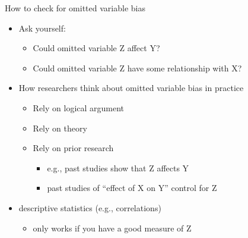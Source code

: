 \begin{frame}{How to check for omitted variable bias}
	\begin{itemize}
	\item Ask yourself: 
		\begin{itemize}
		\item Could omitted variable Z affect Y? 
		\item Could omitted variable Z have some relationship with X?
		\end{itemize}
	\item How researchers think about omitted variable bias in practice
		\begin{itemize}
		\item Rely on logical argument
		\item Rely on theory
		\item Rely on prior research
			\begin{itemize}
				\item e.g., past studies show that Z affects Y
				\item past studies of ``effect of X on Y'' control for Z
			\end{itemize}
		\end{itemize}
		\item descriptive statistics (e.g., correlations)	
		\begin{itemize}
			\item only works if you have a good measure of Z
		\end{itemize}
	\end{itemize}
\end{frame}
		
\begin{comment}
\begin{frame}{How to check for omitted variable bias}
	\begin{itemize}
	\item In practice, diagnostic tests not used as much as logical arguments/literature review
		\begin{itemize}
		\vspace{2mm}
		\item Correlation only picks up linear relationships; omitted variable bias includes non-linear relationships
		\vspace{2mm}
		\item Relationship between X and Z is about ``conditional relationship" after controlling for other covariates
		\vspace{2mm}
		\item Sometimes you don't have a good measure of omitted variable Z
		\end{itemize}
	\end{itemize}
\end{frame}

\end{comment}

